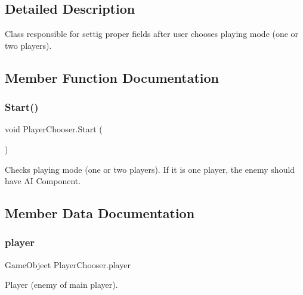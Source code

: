 \subsection{Detailed Description}
Class responsible for settig proper fields after user chooses playing mode (one or two players). 



\subsection{Member Function Documentation}
\mbox{\label{class_player_chooser_ac1fe910f0756a8e4a7dd42fec4b4ddda}} 
\subsubsection{\texorpdfstring{Start()}{Start()}}
{\footnotesize\ttfamily void Player\+Chooser.\+Start (\begin{DoxyParamCaption}{ }\end{DoxyParamCaption})\hspace{0.3cm}{\ttfamily [private]}}



Checks playing mode (one or two players). If it is one player, the enemy should have AI Component. 



\subsection{Member Data Documentation}
\mbox{\label{class_player_chooser_a0b6190b6135c1cda958ac9d079a254c8}} 
\subsubsection{\texorpdfstring{player}{player}}
{\footnotesize\ttfamily Game\+Object Player\+Chooser.\+player}



Player (enemy of main player). 

\mbox{\label{class_player_chooser_ac00fa23a2b9e6ca101d548d1234f5785}} 
